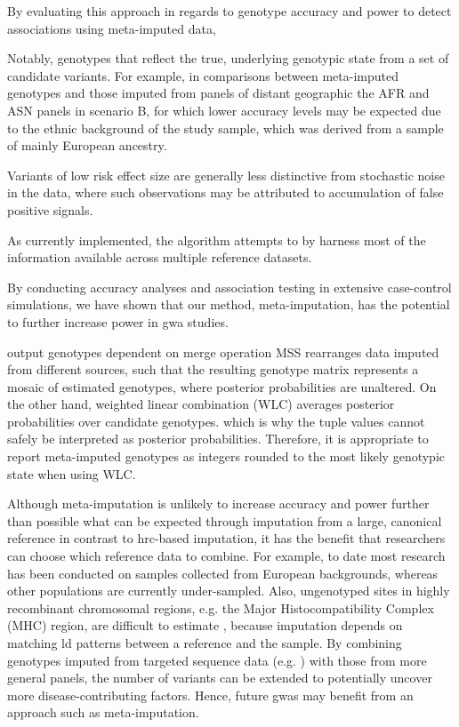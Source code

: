 


By evaluating this approach in regards to genotype accuracy and power to detect associations using meta-imputed data,

Notably, genotypes that reflect the true, underlying genotypic state
from a set of candidate variants.
For example, in comparisons between meta-imputed genotypes and those imputed from panels of distant geographic
the AFR and ASN panels in scenario B, for which lower accuracy levels may be expected due to the ethnic background of the study sample, which was derived from a sample of mainly European ancestry.

Variants of low risk effect size are generally less distinctive from stochastic noise in the data, where such observations may be attributed to accumulation of false positive signals.

As currently implemented, the algorithm attempts to by harness most of the information available across multiple reference datasets.

By conducting accuracy analyses and association testing in extensive case-control simulations, we have shown that our method, meta-imputation, has the potential to further increase power in \gls{gwa} studies.

output genotypes
dependent on merge operation
MSS rearranges data imputed from different sources, such that the resulting genotype matrix represents a mosaic of estimated genotypes, where posterior probabilities are unaltered.
On the other hand, weighted linear combination (WLC) averages posterior probabilities over candidate genotypes.
which is why the tuple values cannot safely be interpreted as posterior probabilities.
Therefore, it is appropriate to report meta-imputed genotypes as integers rounded to the most likely genotypic state when using WLC.

Although meta-imputation is unlikely to increase accuracy and power further than possible
what can be expected through imputation from a large, canonical reference
in contrast to \gls{hrc}-based imputation, it has the benefit that researchers can choose which reference data to combine.
For example, to date most research has been conducted on samples collected from European backgrounds, whereas other populations are currently under-sampled.
Also, ungenotyped sites in highly recombinant chromosomal regions, e.g. the Major Histocompatibility Complex (MHC) region, are difficult to estimate \citep{Chen:2013jx}, because imputation depends on matching \gls{ld} patterns between a reference and the sample. By combining genotypes imputed from targeted sequence data (e.g. \correct{[REF]}) with those from more general panels, the number of variants can be extended to potentially uncover more disease-contributing factors.
Hence, future \gls{gwas} may benefit from an approach such as meta-imputation.


